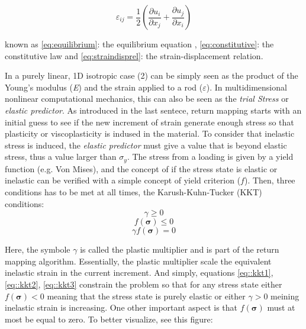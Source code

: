 \documentclass[final,5p,times,twocolumn]{elsarticle}
\begin{document}
\begin{equation} \varepsilon_{ij}=\dfrac{1}{2} \left(\dfrac{\partial u_{i}}{\partial x_{j}} 
                + \dfrac{\partial u_{j}}{\partial x_{i}} \right) \label{eq:straindisprel}
\end{equation}

known as \ref{eq:equilibrium}: the equilibrium equation , \ref{eq:constitutive}: the constitutive law and \ref{eq:straindisprel}: the strain-displacement relation. 

In a purely linear, 1D isotropic case (2) can be simply seen as the product of the Young's modulus (\textit{E}) and the strain applied to a rod ($\varepsilon$). In multidimensional nonlinear computational mechanics, this can also be seen as the \textit{trial Stress} or \textit{elastic predictor}. As introduced in the last sentece, return mapping starts with an initial guess to see if the new increment of strain generate enough stress so that plasticity or viscoplasticity is indused in the material. To consider that inelastic stress is induced, the \textit{elastic predictor} must give a value that is beyond elastic stress, thus a value larger than $\sigma_{y}$. The stress from a loading is given by a yield function (e.g. Von Mises), and the concept of if the stress state is elastic or inelastic can be verified with a simple concept of yield criterion ($f$). Then, three conditions has to be met at all times, the Karush-Kuhn-Tucker (KKT) conditions:
\begin{equation}
  \gamma \geq 0 \label{eq::kkt1}
\end{equation}
\begin{equation}
  f(\mathbf{\sigma}) \leq 0 \label{eq::kkt2}
\end{equation}
\begin{equation}
  \gamma f(\mathbf{\sigma})  = 0 \label{eq:kkt3}
\end{equation}

Here, the symbole $\gamma$ is called the plastic multiplier and is part of the return mapping algorithm. Essentially, the plastic multiplier scale the equivalent inelastic strain in the current increment. And simply, equations \ref{eq::kkt1}, \ref{eq::kkt2}, \ref{eq::kkt3} constrain the problem so that for any stress state either $f(\mathbf{\sigma}) < 0$ meaning that the stress state is purely elastic or either $\gamma > 0$ meining inelastic strain is increasing. One other important aspect is that $f(\mathbf{\sigma})$ must at most be equal to zero. To better visualize, see this figure: 
\end{document}
